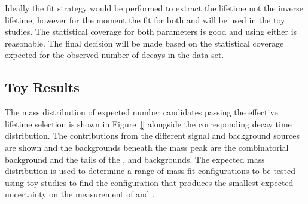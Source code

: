 {Ideally the fit strategy would be performed to extract the lifetime not the inverse lifetime, however for the moment the \ml fit for both \tmumu and \Gmumu will be used in the toy studies. The statistical coverage for both parameters is good and using either is reasonable. The final decision will be made based on the statistical coverage expected for the observed number of decays in the data set. 

\subsection{Toy Results}
\label{sec:toyresults}

The mass distribution of expected number \bsmumu candidates passing the effective lifetime selection is shown in Figure~\ref{} alongside the corresponding decay time distribution. The contributions from the different signal and background sources are shown and the backgrounds beneath the \bs mass peak are the combinatorial background and the tails of the \bhh, \bdmum and \lambdab backgrounds. The expected mass distribution is used to determine a range of mass fit configurations to be tested using toy studies to find the configuration that produces the smallest expected uncertainty on the measurement of \tmumu and \Gmumu.

}
